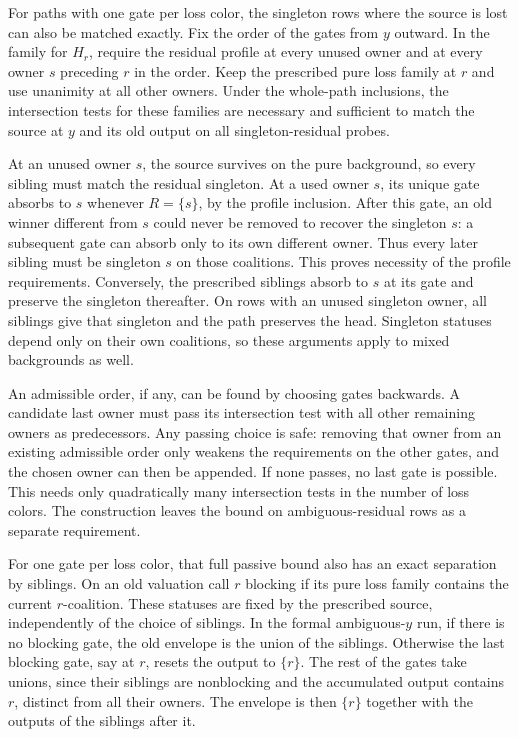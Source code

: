For paths with one gate per loss color, the singleton rows
where the source is lost can also be matched exactly. Fix the
order of the gates from $y$ outward. In the family for $H_r$,
require the residual profile at every unused owner and at every
owner $s$ preceding $r$ in the order. Keep the prescribed pure
loss family at $r$ and use unanimity at all other owners. Under
the whole-path inclusions, the intersection tests for these
families are necessary and sufficient to match the source at
$y$ and its old output on all singleton-residual probes.

At an unused owner $s$, the source survives on the pure
background, so every sibling must match the residual singleton.
At a used owner $s$, its unique gate absorbs to $s$ whenever
$R=\{s\}$, by the profile inclusion. After this gate, an old
winner different from $s$ could never be removed to recover
the singleton $s$: a subsequent gate can absorb only to its
own different owner. Thus every later sibling must be singleton
$s$ on those coalitions. This proves necessity of the profile
requirements. Conversely, the prescribed siblings absorb to
$s$ at its gate and preserve the singleton thereafter. On rows
with an unused singleton owner, all siblings give that singleton
and the path preserves the head. Singleton statuses depend only
on their own coalitions, so these arguments apply to mixed
backgrounds as well.

An admissible order, if any, can be found by choosing gates
backwards. A candidate last owner must pass its intersection
test with all other remaining owners as predecessors. Any
passing choice is safe: removing that owner from an existing
admissible order only weakens the requirements on the other
gates, and the chosen owner can then be appended. If none
passes, no last gate is possible. This needs only quadratically
many intersection tests in the number of loss colors. The
construction leaves the bound on ambiguous-residual rows as
a separate requirement.

For one gate per loss color, that full passive bound also has
an exact separation by siblings. On an old valuation call $r$
blocking if its pure loss family contains the current
$r$-coalition. These statuses are fixed by the prescribed
source, independently of the choice of siblings. In the
formal ambiguous-$y$ run, if there is no blocking gate,
the old envelope is the union of the siblings. Otherwise
the last blocking gate, say at $r$, resets the output to
$\{r\}$. The rest of the gates take unions, since their
siblings are nonblocking and the accumulated output contains
$r$, distinct from all their owners. The envelope is then
$\{r\}$ together with the outputs of the siblings after it.

